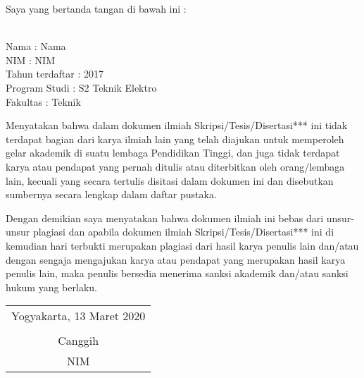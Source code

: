 \noindent Saya yang bertanda tangan di bawah ini :

\vspace{-1em}

\begin{tabbing}
\hspace{40mm} \= \\ %
\noindent Nama \> : Nama \\[\parskip]
\noindent NIM \> : NIM \\[\parskip]
\noindent Tahun terdaftar \> : 2017 \\[\parskip]
\noindent Program Studi \> : S2 Teknik Elektro \\[\parskip]
\noindent Fakultas \> : Teknik
\end{tabbing}

\noindent Menyatakan bahwa dalam dokumen ilmiah Skripsi/Tesis/Disertasi*** ini tidak terdapat bagian dari karya ilmiah lain yang telah diajukan untuk memperoleh gelar akademik di suatu lembaga Pendidikan Tinggi, dan juga tidak terdapat karya atau pendapat yang pernah ditulis atau diterbitkan oleh orang/lembaga lain, kecuali yang secara tertulis disitasi dalam dokumen ini dan disebutkan sumbernya secara lengkap dalam daftar pustaka.

\noindent Dengan demikian saya menyatakan bahwa dokumen ilmiah ini bebas dari unsur-unsur plagiasi dan apabila dokumen ilmiah Skripsi/Tesis/Disertasi*** ini di kemudian hari terbukti merupakan plagiasi dari hasil karya penulis lain dan/atau dengan sengaja mengajukan karya atau pendapat yang merupakan hasil karya penulis lain, maka penulis bersedia menerima sanksi akademik dan/atau sanksi hukum yang berlaku.


\begin{flushright}
	\begin{tabular}{c}
		Yogyakarta, 13 Maret 2020 \\
		\vspace{2.5cm} \\
		Canggih \\ NIM
	\end{tabular}
\end{flushright}
